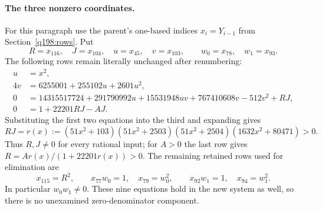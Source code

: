 \paragraph{The three nonzero coordinates.}
For this paragraph use the parent's one-based indices
$x_i=Y_{i-1}$ from Section~\ref{q198:rows}. Put
\[
 R=x_{116},\quad J=x_{104},\quad u=x_{45},\quad v=x_{103},
 \qquad w_0=x_{78},\quad w_1=x_{93}.
\]
The following rows remain literally unchanged after renumbering:
\begin{align*}
 u&=x^2,\\
 4v&=6255001+255102u+2601u^2,\\
 0&=14315517724+291790992u+15531948uv+767410608v-512v^2+RJ,\\
 0&=1+22201RJ-AJ.
\end{align*}
Substituting the first two equations into the third and expanding gives
\[
 RJ=r(x):=(51x^2+103)(51x^2+2503)(51x^2+2504)(1632x^2+80471)>0.
\]
Thus $R,J\ne0$ for every rational input; for $A>0$ the last row gives
$R=Ar(x)/(1+22201r(x))>0$.
The remaining retained rows used for elimination are
\[
 x_{115}=R^2,\qquad x_{77}w_0=1,\quad x_{79}=w_0^2,
 \qquad x_{92}w_1=1,\quad x_{94}=w_1^2.
\]
In particular $w_0w_1\ne0$. These nine equations hold in the new system
as well, so there is no unexamined zero-denominator component.

